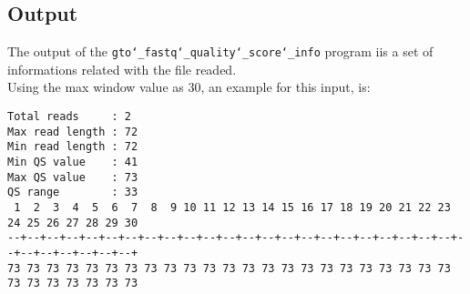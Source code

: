 \subsection*{Output}
The output of the \texttt{gto\char`_fastq\char`_quality\char`_score\char`_info} program iis a set of informations related with the file readed. \\
Using the max window value as 30, an example for this input, is: 
\begin{lstlisting}
Total reads     : 2
Max read length : 72
Min read length : 72
Min QS value    : 41
Max QS value    : 73
QS range        : 33
 1  2  3  4  5  6  7  8  9 10 11 12 13 14 15 16 17 18 19 20 21 22 23 24 25 26 27 28 29 30 
--+--+--+--+--+--+--+--+--+--+--+--+--+--+--+--+--+--+--+--+--+--+--+--+--+--+--+--+--+--+
73 73 73 73 73 73 73 73 73 73 73 73 73 73 73 73 73 73 73 73 73 73 73 73 73 73 73 73 73 73 
\end{lstlisting}